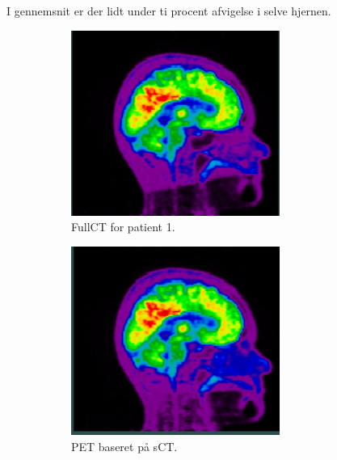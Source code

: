 I gennemsnit er der lidt under ti procent afvigelse i selve hjernen.

\begin{figure}[H]
    \centering
    \begin{subfigure}{0.3\textwidth}
        \centering
        \includegraphics[width=0.75\textwidth]{colager/loocv_pet/loocv_010476_pet_ct.png}
        \caption{FullCT for patient 1.}
        \label{col:loocv_pet_pat1_ct}
    \end{subfigure}\hfill
    \begin{subfigure}{0.3\textwidth}
        \centering
        \includegraphics[width=0.75\textwidth]{colager/loocv_pet/loocv_010476_pet_sct.png}
        \caption{PET baseret på sCT.}
        \label{col:loocv_pet_pat1_sct}
    \end{subfigure}\hfill
    \begin{subfigure}{0.3\textwidth}

\end{subfigure}
\end{figure}
